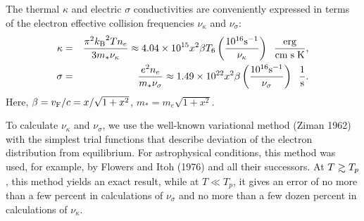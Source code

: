 The thermal $\kappa$ and electric $\sigma$ conductivities are
conveniently expressed in terms of the electron effective
collision frequencies $\nu_\kappa$ and $\nu_\sigma$:
%
\begin{eqnarray}
      \kappa & = & \frac{ \pi^2 \mbox{$k_{\rm B}$}^2 T n_e}{3 m_\ast \nu_\kappa}
             \approx 4.04 \times 10^{15} x^2 \beta T_6
             \left( \frac{10^{16} {\rm s}^{-1}}{\nu_\kappa} \right)
             \; \; {\rm \frac{erg}{cm \; s \; K}},
      \nonumber \\
      \sigma & = & \frac{ e^2 n_e}{m_\ast \nu_\sigma}
             \approx 1.49 \times 10^{22} x^2 \beta
             \left( \frac{10^{16} {\rm s}^{-1}}{\nu_\sigma} \right)
             \; \; {\rm \frac{1}{s}}.
\label{eq:kappasigma}
\end{eqnarray}
%
Here, $\beta = \mbox{$v_{\rm F}$}/c = x /\sqrt{1+x^2}$, $m_\ast = m_e \sqrt{1+x^2}$.

To calculate $\nu_\kappa$ and $\nu_\sigma$, we use the well-known
variational method (Ziman 1962) with the simplest trial
functions that describe deviation of the electron distribution
from equilibrium. For astrophysical conditions, this method was
used, for example, by Flowers and Itoh (1976) and all their
successors. At $T \ga T_p$, this method yields an exact result, while
at $T \ll T_p$, it gives an error of no more than a few percent in
calculations of $\nu_\sigma$ and no more than a few dozen percent
in calculations of $\nu_\kappa$.

